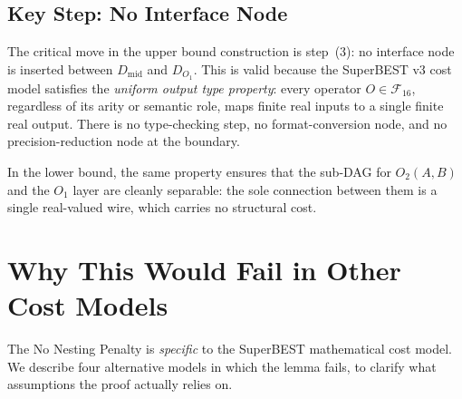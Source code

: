 \documentclass[12pt,a4paper]{article}
\theoremstyle{definition}
\begin{document}
\subsection{Key Step: No Interface Node}

The critical move in the upper bound construction is step~(3): no
interface node is inserted between $D_{\mathrm{mid}}$ and $D_{O_1}$.
This is valid because the SuperBEST v3 cost model satisfies the
\emph{uniform output type property}: every operator $O \in \mathcal{F}_{16}$,
regardless of its arity or semantic role, maps finite real inputs to a
single finite real output.  There is no type-checking step, no
format-conversion node, and no precision-reduction node at the boundary.

In the lower bound, the same property ensures that the sub-DAG for
$O_2(A,B)$ and the $O_1$ layer are cleanly separable: the sole
connection between them is a single real-valued wire, which carries no
structural cost.

\section{Why This Would Fail in Other Cost Models}
\label{sec:failure}

The No Nesting Penalty is \emph{specific} to the SuperBEST mathematical
cost model.  We describe four alternative models in which the lemma fails,
to clarify what assumptions the proof actually relies on.
\end{document}
